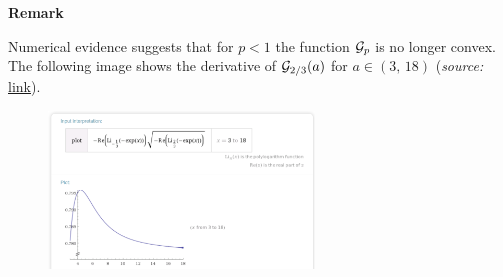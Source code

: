 \documentclass[a4paper]{article}
\begin{document}
\textbf{Remark}

Numerical evidence suggests that for $p<1$ the function $\mathcal G_p$ is no longer convex. The following image shows the derivative of $\mathcal G_{2/3}(a)$ for $a\in(3,\,18)$ (\textit{source:} \href{http://www.wolframalpha.com/input/?i=Plot%
}{link}).
\begin{figure}[h]
	\includegraphics[width=200pt]{polylog_G_less_1}
\end{figure}
\end{document}
